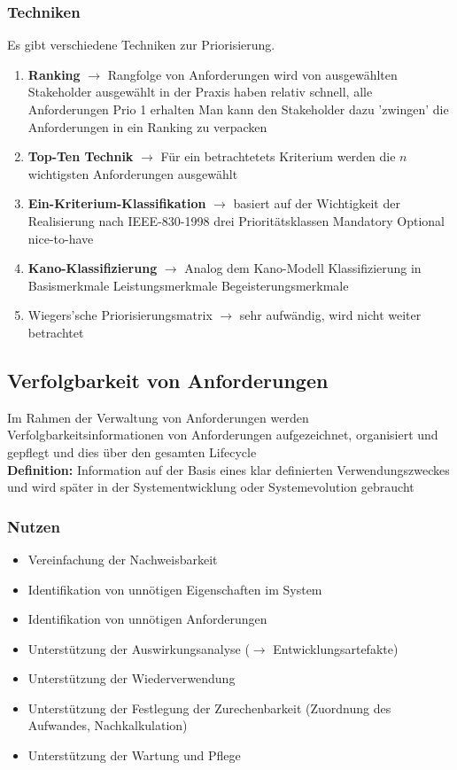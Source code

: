 \documentclass{report}
\theoremstyle{definition}
\theoremstyle{example}
\begin{document}
\subsubsection{Techniken}
Es gibt verschiedene Techniken zur Priorisierung.
\begin{enumerate}
   \item \textbf{Ranking} $\rightarrow$ Rangfolge von Anforderungen wird von ausgewählten Stakeholder ausgewählt
      \subitem in der Praxis haben relativ schnell, alle Anforderungen Prio 1 erhalten
      \subitem Man kann den Stakeholder dazu 'zwingen' die Anforderungen in ein Ranking zu verpacken 
   \item \textbf{Top-Ten Technik} $\rightarrow$ Für ein betrachtetets Kriterium werden die $n$ wichtigsten Anforderungen ausgewählt
   \item \textbf{Ein-Kriterium-Klassifikation} $\rightarrow$ basiert auf der Wichtigkeit der Realisierung
      \subitem nach IEEE-830-1998 drei Prioritätsklassen
         \subsubitem Mandatory
         \subsubitem Optional
         \subsubitem nice-to-have
   \item \textbf{Kano-Klassifizierung} $\rightarrow$ Analog dem Kano-Modell
      \subitem Klassifizierung in 
         \subsubitem Basismerkmale
         \subsubitem Leistungsmerkmale
         \subsubitem Begeisterungsmerkmale
   \item Wiegers'sche Priorisierungsmatrix $\rightarrow$ sehr aufwändig, wird nicht weiter betrachtet
\end{enumerate}

\subsection{Verfolgbarkeit von Anforderungen}
Im Rahmen der Verwaltung von Anforderungen werden Verfolgbarkeitsinformationen von Anforderungen aufgezeichnet, organisiert und gepflegt und dies über den gesamten Lifecycle\\
\textbf{Definition:} Information auf der Basis eines klar definierten Verwendungszweckes und wird später in der Systementwicklung oder Systemevolution gebraucht

\subsubsection{Nutzen}
\begin{itemize}
   \item Vereinfachung der Nachweisbarkeit
   \item Identifikation von unnötigen Eigenschaften im System
   \item Identifikation von unnötigen Anforderungen
   \item Unterstützung der Auswirkungsanalyse ($\rightarrow$ Entwicklungsartefakte)
   \item Unterstützung der Wiederverwendung
   \item Unterstützung der Festlegung der Zurechenbarkeit (Zuordnung des Aufwandes, Nachkalkulation)
   \item Unterstützung der Wartung und Pflege
\end{itemize}
\end{document}
